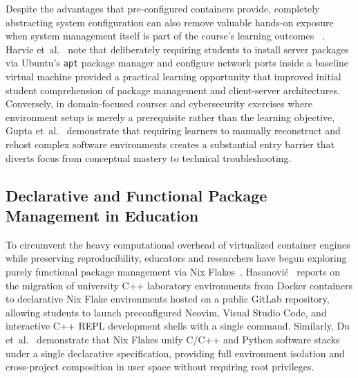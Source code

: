 Despite the advantages that pre-configured containers provide, completely
abstracting system configuration can also remove valuable hands-on exposure when
system management itself is part of the course's learning outcomes ~\cite{harvieUsingVirtualMachines2019}.
Harvie et~al.~\cite{harvieUsingVirtualMachines2019} note that deliberately requiring
students to install server packages via Ubuntu's \texttt{apt} package manager
and configure network ports inside a baseline virtual machine provided a
practical learning opportunity that improved initial student comprehension of
package management and client-server architectures. Conversely, in domain-focused
courses and cybersecurity exercises where environment setup is merely a
prerequisite rather than the learning objective, Gupta et~al.~\cite{guptaCTFArchiveCapture2025}
demonstrate that requiring learners to manually reconstruct and rehost complex
software environments creates a substantial entry barrier that diverts focus
from conceptual mastery to technical troubleshooting.

\subsection{Declarative and Functional Package Management in Education}

To circumvent the heavy computational overhead of virtualized container engines while
preserving reproducibility, educators and researchers have begun exploring
purely functional package management via Nix Flakes~\cite{5BuildingReproducible,duNixRescueReproducible2026a}.
Hasanovi{\'c}~\cite{5BuildingReproducible} reports on the migration of
university C++ laboratory environments from Docker containers to declarative Nix
Flake environments hosted on a public GitLab repository, allowing students to launch
preconfigured Neovim, Visual Studio Code, and interactive C++ REPL development shells
with a single command. Similarly, Du et~al.~\cite{duNixRescueReproducible2026a}
demonstrate that Nix Flakes unify C/C++ and Python software stacks under a
single declarative specification, providing full environment isolation and cross-project
composition in user space without requiring root privileges.


